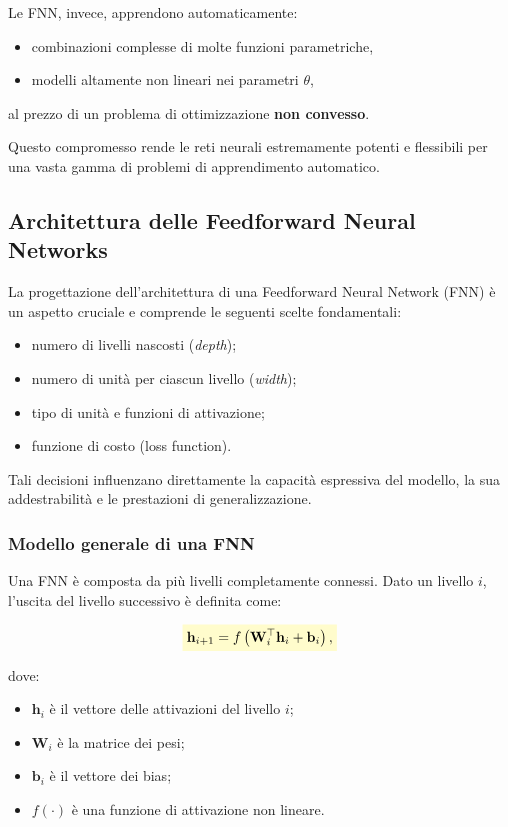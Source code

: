 \documentclass[a4paper,12pt]{report}
\newcommand{\highlight}[1]{%
\colorbox{yellow!20}{$\displaystyle #1$}%
}
\begin{document}
Le FNN, invece, apprendono automaticamente:
\begin{itemize}
    \item combinazioni complesse di molte funzioni parametriche,
    \item modelli altamente non lineari nei parametri $\theta$,
\end{itemize}
al prezzo di un problema di ottimizzazione \textbf{non convesso}.

Questo compromesso rende le reti neurali estremamente potenti e flessibili per una vasta gamma di problemi di apprendimento automatico.

\subsection{Architettura delle Feedforward Neural Networks}

La progettazione dell’architettura di una Feedforward Neural Network (FNN) è un aspetto cruciale e comprende le seguenti scelte fondamentali:
\begin{itemize}
    \item numero di livelli nascosti (\textit{depth});
    \item numero di unità per ciascun livello (\textit{width});
    \item tipo di unità e funzioni di attivazione;
    \item funzione di costo (loss function).
\end{itemize}

Tali decisioni influenzano direttamente la capacità espressiva del modello, la sua addestrabilità e le prestazioni di generalizzazione.

\subsubsection{Modello generale di una FNN}

Una FNN è composta da più livelli completamente connessi.  
Dato un livello $i$, l’uscita del livello successivo è definita come:

\[
\highlight{
\mathbf{h}_{i+1} = f\left( \mathbf{W}_i^\top \mathbf{h}_i + \mathbf{b}_i \right),}
\]

dove:
\begin{itemize}
    \item $\mathbf{h}_i$ è il vettore delle attivazioni del livello $i$;
    \item $\mathbf{W}_i$ è la matrice dei pesi;
    \item $\mathbf{b}_i$ è il vettore dei bias;
    \item $f(\cdot)$ è una funzione di attivazione non lineare.
\end{itemize}
\end{document}
